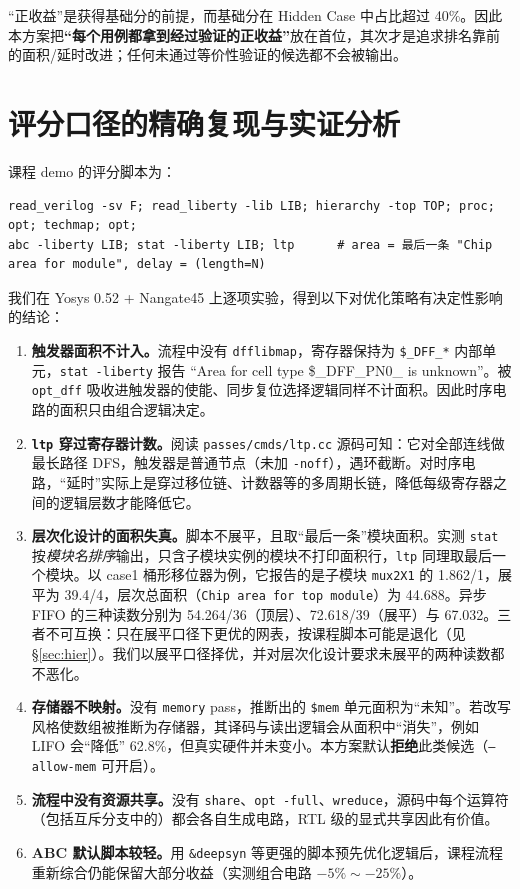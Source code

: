 \documentclass[UTF8,a4paper,zihao=5]{ctexart}
\newcommand{\code}[1]{\texttt{#1}}
\begin{document}
“正收益”是获得基础分的前提，而基础分在 Hidden Case 中占比超过 40\%。因此本方案把\textbf{“每个用例都拿到经过验证的正收益”}放在首位，其次才是追求排名靠前的面积/延时改进；任何未通过等价性验证的候选都不会被输出。

\section{评分口径的精确复现与实证分析}\label{sec:metric}

课程 demo 的评分脚本为：
\begin{lstlisting}
read_verilog -sv F; read_liberty -lib LIB; hierarchy -top TOP; proc; opt; techmap; opt;
abc -liberty LIB; stat -liberty LIB; ltp      # area = 最后一条 "Chip area for module", delay = (length=N)
\end{lstlisting}
我们在 Yosys 0.52 + Nangate45 上逐项实验，得到以下对优化策略有决定性影响的结论：

\begin{enumerate}
\item \textbf{触发器面积不计入。}流程中没有 \code{dfflibmap}，寄存器保持为 \code{\$\_DFF\_*} 内部单元，\code{stat -liberty} 报告 “Area for cell type \$\_DFF\_PN0\_ is unknown”。被 \code{opt\_dff} 吸收进触发器的使能、同步复位选择逻辑同样不计面积。因此时序电路的面积只由组合逻辑决定。
\item \textbf{\code{ltp} 穿过寄存器计数。}阅读 \code{passes/cmds/ltp.cc} 源码可知：它对全部连线做最长路径 DFS，触发器是普通节点（未加 \code{-noff}），遇环截断。对时序电路，“延时”实际上是穿过移位链、计数器等的多周期长链，降低每级寄存器之间的逻辑层数才能降低它。
\item \textbf{层次化设计的面积失真。}脚本不展平，且取“最后一条”模块面积。实测 \code{stat} 按\emph{模块名排序}输出，只含子模块实例的模块不打印面积行，\code{ltp} 同理取最后一个模块。以 case1 桶形移位器为例，它报告的是子模块 \code{mux2X1} 的 1.862/1，展平为 39.4/4，层次总面积（\code{Chip area for top module}）为 44.688。异步 FIFO 的三种读数分别为 54.264/36（顶层）、72.618/39（展平）与 67.032。三者不可互换：只在展平口径下更优的网表，按课程脚本可能是退化（见 \S\ref{sec:hier}）。我们以展平口径择优，并对层次化设计要求未展平的两种读数都不恶化。
\item \textbf{存储器不映射。}没有 \code{memory} pass，推断出的 \code{\$mem} 单元面积为“未知”。若改写风格使数组被推断为存储器，其译码与读出逻辑会从面积中“消失”，例如 LIFO 会“降低” 62.8\%，但真实硬件并未变小。本方案默认\textbf{拒绝}此类候选（\code{--allow-mem} 可开启）。
\item \textbf{流程中没有资源共享。}没有 \code{share}、\code{opt -full}、\code{wreduce}，源码中每个运算符（包括互斥分支中的）都会各自生成电路，RTL 级的显式共享因此有价值。
\item \textbf{ABC 默认脚本较轻。}用 \code{\&deepsyn} 等更强的脚本预先优化逻辑后，课程流程重新综合仍能保留大部分收益（实测组合电路 $-5\%\sim-25\%$）。
\end{enumerate}
\end{document}
